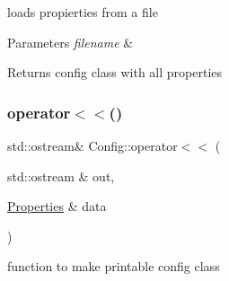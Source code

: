 loads propierties from a file 


\begin{DoxyParams}{Parameters}
{\em filename} & \\
\hline
\end{DoxyParams}
\begin{DoxyReturn}{Returns}
config class with all properties 
\end{DoxyReturn}
\mbox{\label{namespace_config_af48e0d12acc53c2d353939b563e472e2}} 
\subsubsection{\texorpdfstring{operator$<$$<$()}{operator<<()}}
{\footnotesize\ttfamily std\+::ostream\& Config\+::operator$<$$<$ (\begin{DoxyParamCaption}\item[{std\+::ostream \&}]{out,  }\item[{\hyperlink{class_config_1_1_properties}{Properties} \&}]{data }\end{DoxyParamCaption})\hspace{0.3cm}{\ttfamily [inline]}}



function to make printable config class 

